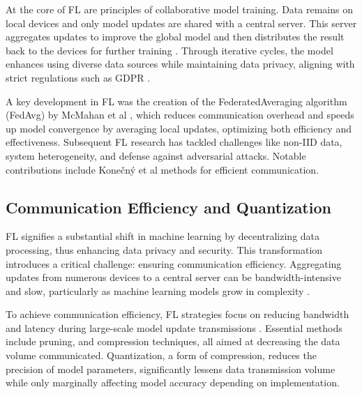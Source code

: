 \documentclass{article}
\begin{document}
At the core of FL are principles of collaborative model training. Data remains on local devices and only model updates are shared with a central server. This server aggregates updates to improve the global model and then distributes the result back to the devices for further training \cite{Li_2020}. Through iterative cycles, the model enhances using diverse data sources while maintaining data privacy, aligning with strict regulations such as GDPR \cite{team2020eu}.

A key development in FL was the creation of the FederatedAveraging algorithm (FedAvg) by McMahan et al \cite{DBLP:journals/corr/abs-1710-06963}, which reduces communication overhead and speeds up model convergence by averaging local updates, optimizing both efficiency and effectiveness. Subsequent FL research has tackled challenges like non-IID data, system heterogeneity, and defense against adversarial attacks. Notable contributions include Konečný et al\cite{konevcny2016federated} methods for efficient communication.

\subsection{Communication Efficiency and Quantization}

FL signifies a substantial shift in machine learning by decentralizing data processing, thus enhancing data privacy and security. This transformation introduces a critical challenge: ensuring communication efficiency. Aggregating updates from numerous devices to a central server can be bandwidth-intensive and slow, particularly as machine learning models grow in complexity \cite{li2023pbfl}.

To achieve communication efficiency, FL strategies focus on reducing bandwidth and latency during large-scale model update transmissions \cite{li2023pbfl}. Essential methods include pruning, and compression techniques, all aimed at decreasing the data volume communicated. Quantization, a form of compression, reduces the precision of model parameters, significantly lessens data transmission volume while only marginally affecting model accuracy depending on implementation\cite{jacob2018quantization}.
\end{document}
